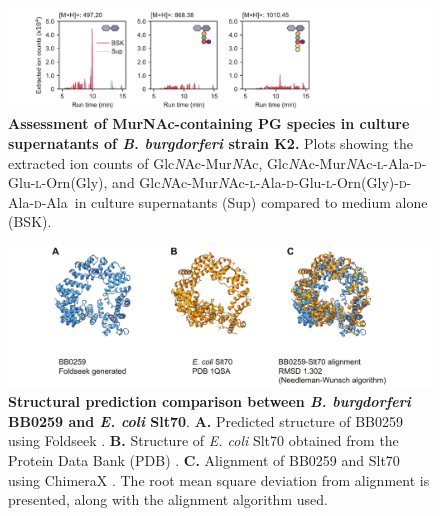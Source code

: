 \documentclass[twoside, watermark]{zHenriquesLab-StyleBioRxiv}
\newcommand{\AEOAAG}{\textsc{l}-Ala-\textsc{d}-Glu-\textsc{l}-Orn(Gly)-\textsc{d}-Ala-\textsc{d}-Ala}
\newcommand{\AEOG}{\textsc{l}-Ala-\textsc{d}-Glu-\textsc{l}-Orn(Gly)}
\newcommand{\NAM}{Mur\textit{N}Ac}
\newcommand{\NAG}{Glc\textit{N}Ac}
\begin{document}
\pagebreak
\begin{figure}[ht!]
    \centering
    \includegraphics[width = \textwidth]{Figures/Figure_S8_Anhydros_Only_Are_Enriched.pdf}
    \caption{\textbf{Assessment of MurNAc-containing PG species in culture supernatants of \textit{B. burgdorferi} strain K2.} Plots showing the extracted ion counts of \NAG-\NAM, \NAG-\NAM-\AEOG, and \NAG-\NAM-\AEOAAG~in culture supernatants (Sup) compared to medium alone (BSK).}
    \label{fig: figS8}
\end{figure}

\pagebreak
\begin{figure}[ht!]
    \centering
    \includegraphics[width = \textwidth]{Figures/Figure_S9_LTgase_Slt70_alignment.pdf}
    \caption{\textbf{Structural prediction comparison between \textit{B. burgdorferi} BB0259 and \textit{E. coli} Slt70}. \textbf{A.} Predicted structure of BB0259 using Foldseek \cite{Kempen2023}. \textbf{B.} Structure of \textit{E. coli} Slt70 obtained from the Protein Data Bank (PDB) \cite{Berman2000,Asselt1999}. \textbf{C.} Alignment of BB0259 and Slt70 using ChimeraX \cite{Meng2023}. The root mean square deviation from alignment is presented, along with the alignment algorithm used.}
    \label{fig: figS9}
\end{figure}
\end{document}
